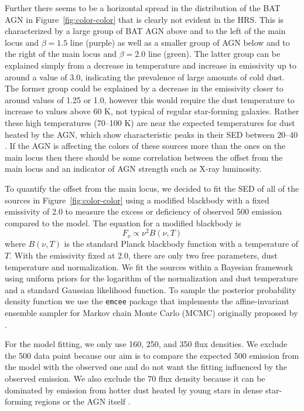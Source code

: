 Further there seems to be a horizontal spread in the distribution of the BAT AGN in Figure~\ref{fig:color-color} that is clearly not evident in the HRS. This is characterized by a large group of BAT AGN above and to the left of the main locus and $\beta=1.5$ line (purple) as well as a smaller group of AGN below and to the right of the main locus and $\beta=2.0$ line (green). The latter group can be explained simply from a decrease in temperature and increase in emissivity up to around a value of 3.0, indicating the prevalence of large amounts of cold dust. The former group could be explained by a decrease in the emissivity closer to around values of 1.25 or 1.0, however this would require the dust temperature to increase to values above 60 K, not typical of regular star-forming galaxies. Rather these high temperatures (70--100 K) are near the expected temperatures for dust heated by the AGN, which show characteristic peaks in their SED between 20--40 \um{} \citep{Richards:2006fj,Netzer:2007ve,Mullaney:2011yq}. If the AGN is affecting the colors of these sources more than the ones on the main locus then there should be some correlation between the offset from the main locus and an indicator of AGN strength such as X-ray luminosity. 

To quantify the offset from the main locus, we decided to fit the SED of all of the sources in Figure~\ref{fig:color-color} using a modified blackbody with a fixed emissivity of 2.0 to measure the excess or deficiency of observed 500 \um{} emission compared to the model. The equation for a modified blackbody is
\begin{equation}\label{eq:mod_blackbody}
F_{\nu} \propto \nu^{2}B(\nu, T)
\end{equation}
\noindent where $B(\nu, T)$ is the standard Planck blackbody function with a temperature of $T$. With the emissivity fixed at 2.0, there are only two free parameters, dust temperature and normalization. We fit the sources within a Bayesian framework using uniform priors for the logarithm of the normalization and dust temperature and a standard Gaussian likelihood function. To sample the posterior probability density function we use the \texttt{emcee} package \citep{Foreman_Mackey_2013} that implements the affine-invariant ensemble sampler for Markov chain Monte Carlo (MCMC) originally proposed by \citet{Goodman_2010}. 

For the model fitting, we only use 160, 250, and 350 \um{} flux densities. We exclude the 500 \um{} data point because our aim is to compare the expected 500 \um{} emission from the model with the observed one and do not want the fitting influenced by the observed emission. We also exclude the 70 \um{} flux density because it can be dominated by emission from hotter dust heated by young stars in dense star-forming regions or the AGN itself \citep{Calzetti:2000fk, :2010kq, Boquien:2011qf, Smith:2012fj, Melendez:2014yu}.





  
  
  
  